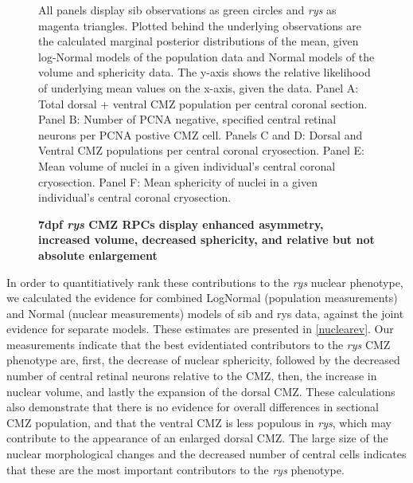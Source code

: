 \begin{figure}[!h]
    \caption{{\bf 7dpf \textit{rys} CMZ RPCs display enhanced asymmetry, increased volume, decreased sphericity, and relative but not absolute enlargement}}
    \label{nuclearstudy}
    All panels display sib observations as green circles and \textit{rys} as magenta triangles. Plotted behind the underlying observations are the calculated marginal posterior distributions of the mean, given log-Normal models of the population data and Normal models of the volume and sphericity data. The y-axis shows the relative likelihood of underlying mean values on the x-axis, given the data.
    Panel A: Total dorsal + ventral CMZ population per central coronal section.
    Panel B: Number of PCNA negative, specified central retinal neurons per PCNA postive CMZ cell.
    Panels C and D: Dorsal and Ventral CMZ populations per central coronal cryosection.
    Panel E: Mean volume of nuclei in a given individual's central coronal cryosection.
    Panel F: Mean sphericity of nuclei in a given individual's central coronal cryosection.
\end{figure}

In order to quantitiatively rank these contributions to the \textit{rys} nuclear phenotype, we calculated the evidence for combined LogNormal (population measurements) and Normal (nuclear measurements) models of sib and rys data, against the joint evidence for separate models. These estimates are presented in \autoref{nuclearev}. Our measurements indicate that the best evidentiated contributors to the \textit{rys} CMZ phenotype are, first, the decrease of nuclear sphericity, followed by the decreased number of central retinal neurons relative to the CMZ, then, the increase in nuclear volume, and lastly the expansion of the dorsal CMZ. These calculations also demonstrate that there is no evidence for overall differences in sectional CMZ population, and that the ventral CMZ is less populous in \textit{rys}, which may contribute to the appearance of an enlarged dorsal CMZ. The large size of the nuclear morphological changes and the decreased number of central cells indicates that these are the most important contributors to the \textit{rys} phenotype.

